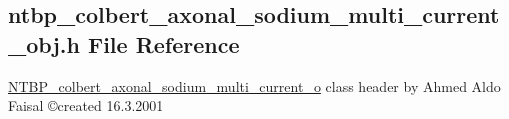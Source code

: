 \subsection{ntbp\_\-colbert\_\-axonal\_\-sodium\_\-multi\_\-current\_\-obj.h File Reference}
\label{ntbp__colbert__axonal__sodium__multi__current__obj_8h}



\begin{DoxyItemize}
\item \hyperlink{class_n_t_b_p__colbert__axonal__sodium__multi__current__o}{NTBP\_\-colbert\_\-axonal\_\-sodium\_\-multi\_\-current\_\-o} class header by Ahmed Aldo Faisal \copyright created 16.3.2001 
\end{DoxyItemize} 


